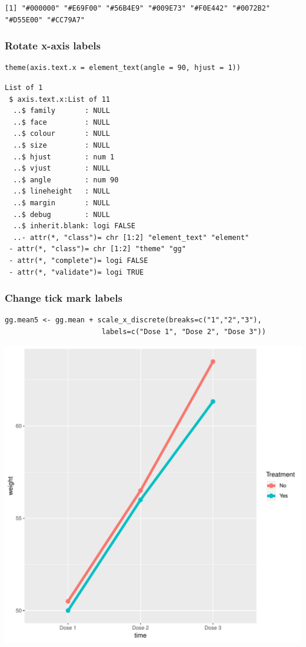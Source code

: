 \documentclass{article}
\begin{document}
\begin{verbatim}
[1] "#000000" "#E69F00" "#56B4E9" "#009E73" "#F0E442" "#0072B2" "#D55E00" "#CC79A7"
\end{verbatim}

\subsubsection{Rotate x-axis labels}
\label{sec:orgc3a1a43}
\lstset{language=r,label= ,caption= ,captionpos=b,numbers=none}
\begin{lstlisting}
theme(axis.text.x = element_text(angle = 90, hjust = 1))
\end{lstlisting}

\begin{verbatim}
List of 1
 $ axis.text.x:List of 11
  ..$ family       : NULL
  ..$ face         : NULL
  ..$ colour       : NULL
  ..$ size         : NULL
  ..$ hjust        : num 1
  ..$ vjust        : NULL
  ..$ angle        : num 90
  ..$ lineheight   : NULL
  ..$ margin       : NULL
  ..$ debug        : NULL
  ..$ inherit.blank: logi FALSE
  ..- attr(*, "class")= chr [1:2] "element_text" "element"
 - attr(*, "class")= chr [1:2] "theme" "gg"
 - attr(*, "complete")= logi FALSE
 - attr(*, "validate")= logi TRUE
\end{verbatim}

\subsubsection{Change tick mark labels}
\label{sec:org25e2e88}

\lstset{language=r,label= ,caption= ,captionpos=b,numbers=none}
\begin{lstlisting}
gg.mean5 <- gg.mean + scale_x_discrete(breaks=c("1","2","3"),
				       labels=c("Dose 1", "Dose 2", "Dose 3"))
\end{lstlisting}

\begin{center}
\includegraphics[width=.9\linewidth]{./figures/fig-meanTime5.pdf}
\end{center}
\end{document}
